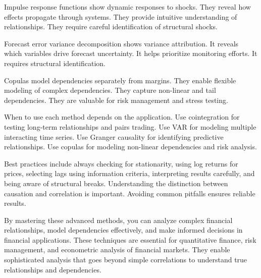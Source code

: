 Impulse response functions show dynamic responses to shocks. They reveal how effects propagate through systems. They provide intuitive understanding of relationships. They require careful identification of structural shocks.

Forecast error variance decomposition shows variance attribution. It reveals which variables drive forecast uncertainty. It helps prioritize monitoring efforts. It requires structural identification.

Copulas model dependencies separately from margins. They enable flexible modeling of complex dependencies. They capture non-linear and tail dependencies. They are valuable for risk management and stress testing.

When to use each method depends on the application. Use cointegration for testing long-term relationships and pairs trading. Use VAR for modeling multiple interacting time series. Use Granger causality for identifying predictive relationships. Use copulas for modeling non-linear dependencies and risk analysis.

Best practices include always checking for stationarity, using log returns for prices, selecting lags using information criteria, interpreting results carefully, and being aware of structural breaks. Understanding the distinction between causation and correlation is important. Avoiding common pitfalls ensures reliable results.

By mastering these advanced methods, you can analyze complex financial relationships, model dependencies effectively, and make informed decisions in financial applications. These techniques are essential for quantitative finance, risk management, and econometric analysis of financial markets. They enable sophisticated analysis that goes beyond simple correlations to understand true relationships and dependencies.

